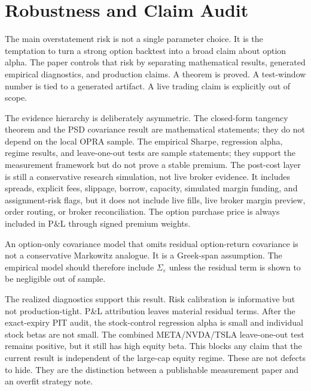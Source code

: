 \section{Robustness and Claim Audit}

The main overstatement risk is not a single parameter choice. It is the temptation to turn
a strong option backtest into a broad claim about option alpha. The paper controls that
risk by separating mathematical results, generated empirical diagnostics, and production
claims. A theorem is proved. A test-window number is tied to a generated artifact. A live
trading claim is explicitly out of scope.

\begin{table}[H]
\centering
\resizebox{\textwidth}{!}{}
\caption{Claim-audit summary. The table is generated by the empirical runner.}
\label{tab:claimaudit}
\end{table}

The evidence hierarchy is deliberately asymmetric. The closed-form tangency theorem and
the PSD covariance result are mathematical statements; they do not depend on the local
OPRA sample. The empirical Sharpe, regression alpha, regime results, and leave-one-out
tests are sample statements; they support the measurement framework but do not prove a
stable premium. The post-cost layer is still a conservative research simulation, not live
broker evidence. It includes spreads, explicit fees, slippage, borrow, capacity, simulated
margin funding, and assignment-risk flags, but it does not include live fills, live broker
margin preview, order routing, or broker reconciliation. The option purchase price is
always included in P\&L through signed premium weights.

\begin{result}
\label{res:residualrisk}
An option-only covariance model that omits residual option-return covariance is not a
conservative Markowitz analogue. It is a Greek-span assumption. The empirical model should
therefore include \(\Sigma_\varepsilon\) unless the residual term is shown to be
negligible out of sample.
\end{result}

The realized diagnostics support this result. Risk calibration is informative but not
production-tight. P\&L attribution leaves material residual terms. After the exact-expiry
PIT audit, the stock-control regression alpha is small and individual stock betas are not
small. The combined META/NVDA/TSLA leave-one-out test remains positive, but it still has
high equity beta. This blocks any claim that the current result is independent of the
large-cap equity regime. These are not defects to hide. They are the distinction between a
publishable measurement paper and an overfit strategy note.

